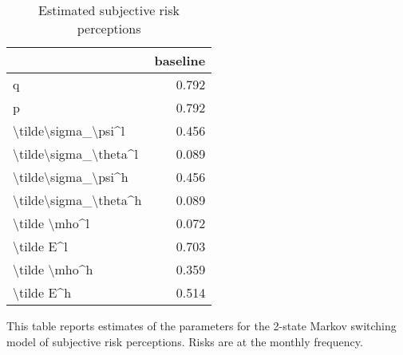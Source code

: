 \clearpage


\begin{table}[p]
\centering
\begin{adjustbox}{width=0.3\textwidth}
\begin{threeparttable}
\caption{Estimated subjective risk perceptions}
\label{tab:PRMarkovEst}\begin{tabular}{lr}
\toprule
{} &  baseline \\
\midrule
q                     &     0.792 \\
p                     &     0.792 \\
\textbackslash tilde\textbackslash sigma\_\textbackslash psi\textasciicircum l   &     0.456 \\
\textbackslash tilde\textbackslash sigma\_\textbackslash theta\textasciicircum l &     0.089 \\
\textbackslash tilde\textbackslash sigma\_\textbackslash psi\textasciicircum h   &     0.456 \\
\textbackslash tilde\textbackslash sigma\_\textbackslash theta\textasciicircum h &     0.089 \\
\textbackslash tilde \textbackslash mho\textasciicircum l         &     0.072 \\
\textbackslash tilde E\textasciicircum l            &     0.703 \\
\textbackslash tilde \textbackslash mho\textasciicircum h         &     0.359 \\
\textbackslash tilde E\textasciicircum h            &     0.514 \\
\bottomrule
\end{tabular}
\begin{tablenotes}\item This table reports estimates of the parameters 
for the 2-state Markov switching model of subjective risk perceptions. Risks are at the monthly frequency. 
\end{tablenotes}
\end{threeparttable}
\end{adjustbox}
\end{table}
